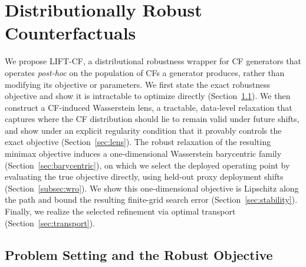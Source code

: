 \section{Distributionally Robust Counterfactuals}

We propose \textsc{LIFT-CF}, a distributional robustness wrapper for CF generators that operates \emph{post-hoc} on the population of CFs a generator produces, rather than modifying its objective or parameters.
We first state the exact robustness objective and show it is intractable to optimize directly (Section~\ref{sec:objective}). 
We then construct a CF-induced Wasserstein lens, a tractable, data-level relaxation that captures where the CF distribution should lie to remain valid under future shifts, and show under an explicit regularity condition that it provably controls the exact objective (Section~\ref{sec:lens}). The robust relaxation of the resulting minimax objective induces a one-dimensional Wasserstein barycentric family (Section~\ref{sec:barycentric}), on which we select the deployed operating point by evaluating the true objective directly, using held-out proxy deployment shifts (Section~\ref{subsec:wro}). We show this one-dimensional objective is Lipschitz along the path and bound the resulting finite-grid search error (Section~\ref{sec:stability}).
Finally, we realize the selected refinement via optimal transport (Section~\ref{sec:transport}).

\subsection{Problem Setting and the Robust Objective}\label{sec:objective}

